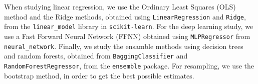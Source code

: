 \documentclass[reprint,english,notitlepage]{revtex4-1}  %
\begin{document}
When studying linear regression, we use the Ordinary Least Squares (OLS) method and the Ridge methods, obtained using {\lstinline[language={[python]TeX}, basicstyle=\ttfamily]|LinearRegression|} and {\lstinline[language={[python]TeX}, basicstyle=\ttfamily]|Ridge|}, from the {\lstinline[language={[python]TeX}, basicstyle=\ttfamily]|linear_model|} library in {\lstinline[language={[python]TeX}, basicstyle=\ttfamily]|scikit-learn|}. For the deep learning study, we use a Fast Forward Neural Network (FFNN) obtained using {\lstinline[language={[python]TeX}, basicstyle=\ttfamily]|MLPRegressor|} from {\lstinline[language={[python]TeX}, basicstyle=\ttfamily]|neural_network|}. Finally, we study the ensamble methods using decision trees and random forests, obtained from {\lstinline[language={[python]TeX}, basicstyle=\ttfamily]|BaggingClassifier|} and {\lstinline[language={[python]TeX}, basicstyle=\ttfamily]|RandomForestRegressor|}, from the {\lstinline[language={[python]TeX}, basicstyle=\ttfamily]|ensemble|} package. 
For resampling, we use the bootstrap method, in order to get the best possible estimates. 
\end{document}
